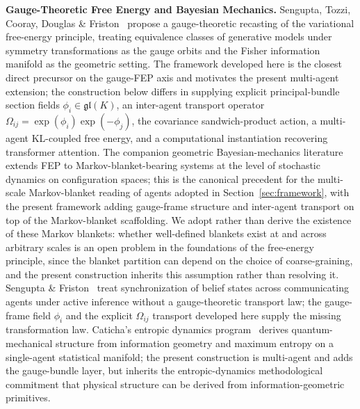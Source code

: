 \documentclass[11pt]{article}
\begin{document}
\textbf{Gauge-Theoretic Free Energy and Bayesian Mechanics.} Sengupta, Tozzi, Cooray, Douglas \& Friston~\cite{Sengupta2016NeuronalGauge} propose a gauge-theoretic recasting of the variational free-energy principle, treating equivalence classes of generative models under symmetry transformations as the gauge orbits and the Fisher information manifold as the geometric setting. The framework developed here is the closest direct precursor on the gauge-FEP axis and motivates the present multi-agent extension; the construction below differs in supplying explicit principal-bundle section fields $\phi_i \in \mathfrak{gl}(K)$, an inter-agent transport operator $\Omega_{ij} = \exp(\phi_i)\exp(-\phi_j)$, the covariance sandwich-product action, a multi-agent KL-coupled free energy, and a computational instantiation recovering transformer attention. The companion geometric Bayesian-mechanics literature~\cite{Sakthivadivel2022, KirchhoffParrPalaciosFristonKiverstein2018} extends FEP to Markov-blanket-bearing systems at the level of stochastic dynamics on configuration spaces; this is the canonical precedent for the multi-scale Markov-blanket reading of agents adopted in Section~\ref{sec:framework}, with the present framework adding gauge-frame structure and inter-agent transport on top of the Markov-blanket scaffolding. We adopt rather than derive the existence of these Markov blankets: whether well-defined blankets exist at and across arbitrary scales is an open problem in the foundations of the free-energy principle, since the blanket partition can depend on the choice of coarse-graining, and the present construction inherits this assumption rather than resolving it. Sengupta \& Friston~\cite{SenguptaFriston2018} treat synchronization of belief states across communicating agents under active inference without a gauge-theoretic transport law; the gauge-frame field $\phi_i$ and the explicit $\Omega_{ij}$ transport developed here supply the missing transformation law. Caticha's entropic dynamics program~\cite{Caticha2019} derives quantum-mechanical structure from information geometry and maximum entropy on a single-agent statistical manifold; the present construction is multi-agent and adds the gauge-bundle layer, but inherits the entropic-dynamics methodological commitment that physical structure can be derived from information-geometric primitives.
\end{document}

